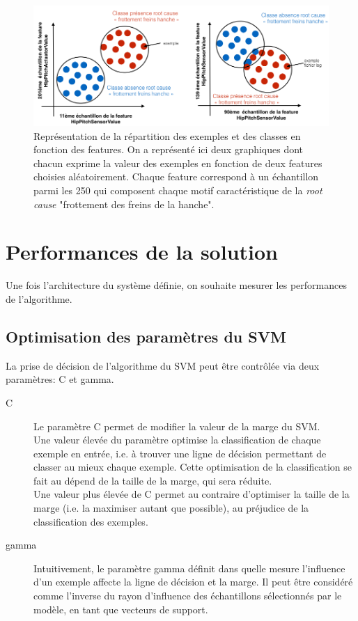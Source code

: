 \begin{figure}[h]
	\centering\includegraphics[width=12cm]{images/classes_sys.png}
	\caption[Représentation de la répartition des exemples et des classes en fonction des features,  approche fonctionnelle]{Représentation de la répartition des exemples et des classes en fonction des features. On a représenté ici deux graphiques dont chacun exprime la valeur des exemples en fonction de deux features choisies aléatoirement. Chaque feature correspond à un échantillon parmi les 250 qui composent chaque motif caractéristique de la \emph{root cause} "frottement des freins de la hanche".}
	\label{fig:Courbe de probabilité de la root cause "frottement des freins de la hanche"}
\end{figure}


\section{Performances de la solution}
\label{Automatisation du processus d'investigation: Performances de la solution}
Une fois l'architecture du système définie, on souhaite mesurer les performances de l'algorithme.

\subsection{Optimisation des paramètres du SVM}
\label{Industrialisation du produit: Performances de la solution:Optimisation des paramètres du SVM}
La prise de décision de l'algorithme du SVM peut être contrôlée via deux paramètres: C et gamma.
\begin{description}
	\item [C] Le paramètre C permet de modifier la valeur de la marge du SVM. \\
	Une valeur élevée du paramètre optimise la classification de chaque exemple en entrée, i.e. à trouver une ligne de décision permettant de classer au mieux chaque exemple. Cette optimisation de la classification se fait au dépend de la taille de la marge, qui sera réduite. \\
	Une valeur plus élevée de C permet au contraire d'optimiser la taille de la marge (i.e. la maximiser autant que possible), au préjudice de la classification des exemples.
	\item [gamma] Intuitivement, le paramètre gamma définit dans quelle mesure l'influence d'un exemple affecte la ligne de décision et la marge. Il peut être considéré comme l'inverse du rayon d'influence des échantillons sélectionnés par le modèle, en tant que vecteurs de support.
\end{description}


